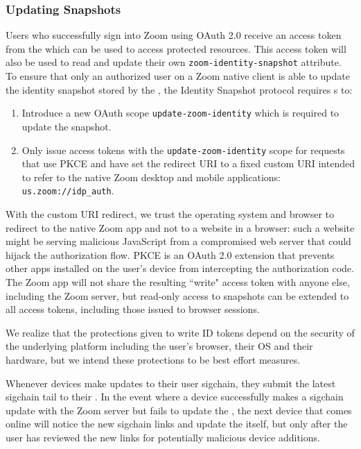 \subsubsection{Updating Snapshots}

Users who successfully sign into Zoom using OAuth 2.0 receive an access token from the \idp which
can be used to access protected resources. This access token will also be used to read and update
their own \texttt{zoom-identity-snapshot} attribute. To ensure that only an authorized user on a
Zoom native client is able to update the identity snapshot stored by the \idp, the Identity Snapshot
protocol requires {\idp}s to:

\begin{enumerate}
\item Introduce a new OAuth scope \texttt{update-zoom-identity} which is required to update the
    snapshot.
\item Only issue access tokens with the \texttt{update-zoom-identity} scope for requests that use
    PKCE and have set the redirect URI to a fixed custom URI intended to refer to the native Zoom
    desktop and mobile applications: \texttt{us.zoom://idp\_auth}.
\end{enumerate}

With the custom URI redirect, we trust the operating system and browser to redirect to the native
Zoom app and not to a website in a browser: such a website might be serving malicious JavaScript
from a compromised web server that could hijack the authorization flow. PKCE is an OAuth 2.0
extension that prevents other apps installed on the user's device from intercepting the
authorization code. The Zoom app will not share the resulting ``write" access token with anyone
else, including the Zoom server, but read-only access to snapshots can be extended to all access
tokens, including those issued to browser sessions.

We realize that the protections given to write ID tokens depend on the security of the underlying
platform including the user’s browser, their OS and their hardware, but we intend these protections to be
best effort measures.

Whenever devices make updates to their user sigchain, they submit the latest sigchain tail to their
\idp. In the event where a device successfully makes a sigchain update with the Zoom server but
fails to update the \idp, the next device that comes online will notice the new sigchain links and
update the \idp itself, but only after the user has reviewed the new links for potentially malicious
device additions.

